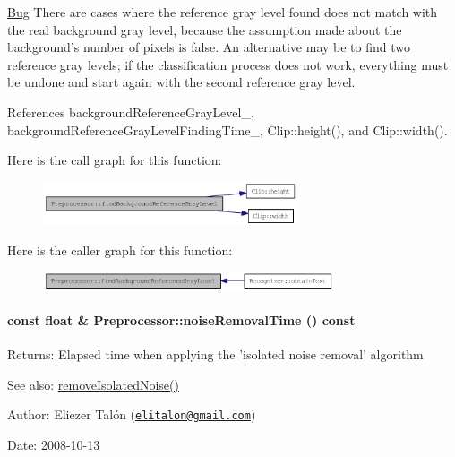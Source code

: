 \begin{Desc}
\item[\hyperlink{bug__bug000001}{Bug}]There are cases where the reference gray level found does not match with the real background gray level, because the assumption made about the background's number of pixels is false. An alternative may be to find two reference gray levels; if the classification process does not work, everything must be undone and start again with the second reference gray level. \end{Desc}


References backgroundReferenceGrayLevel\_\-, backgroundReferenceGrayLevelFindingTime\_\-, Clip::height(), and Clip::width().

Here is the call graph for this function:\nopagebreak
\begin{figure}[H]
\begin{center}
\leavevmode
\includegraphics[width=213pt]{class_preprocessor_a941f81382bd8e235e4dd12481342be4_cgraph}
\end{center}
\end{figure}


Here is the caller graph for this function:\nopagebreak
\begin{figure}[H]
\begin{center}
\leavevmode
\includegraphics[width=244pt]{class_preprocessor_a941f81382bd8e235e4dd12481342be4_icgraph}
\end{center}
\end{figure}
\hypertarget{class_preprocessor_ff8eee937760e42c0c2bea307849ada1}{
\paragraph[{noiseRemovalTime}]{\setlength{\rightskip}{0pt plus 5cm}const float \& Preprocessor::noiseRemovalTime () const}\hfill}
\label{class_preprocessor_ff8eee937760e42c0c2bea307849ada1}


\begin{Desc}
\item[Returns:]Elapsed time when applying the 'isolated noise removal' algorithm\end{Desc}
\begin{Desc}
\item[See also:]\hyperlink{class_preprocessor_a3e047486a0a80f2103f51d7141e41c5}{removeIsolatedNoise()}\end{Desc}
\begin{Desc}
\item[Author:]Eliezer Talón (\href{mailto:elitalon@gmail.com}{\tt elitalon@gmail.com}) \end{Desc}
\begin{Desc}
\item[Date:]2008-10-13 \end{Desc}


